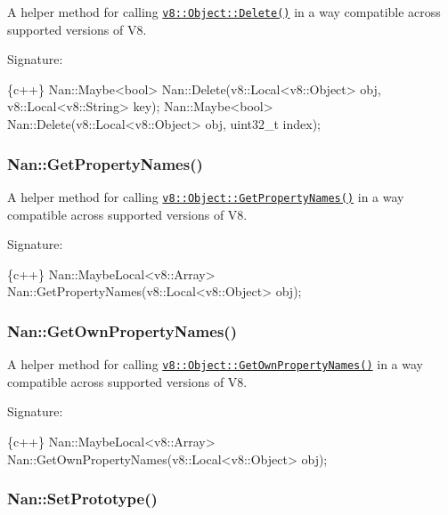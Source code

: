 A helper method for calling \href{https://v8docs.nodesource.com/io.js-3.0/db/d85/classv8_1_1_object.html#a2fa0f5a592582434ed1ceceff7d891ef}{\tt {\ttfamily v8\+::\+Object\+::\+Delete()}} in a way compatible across supported versions of V8.

Signature\+:


\begin{DoxyCode}
\{c++\}
Nan::Maybe<bool> Nan::Delete(v8::Local<v8::Object> obj,
                             v8::Local<v8::String> key);
Nan::Maybe<bool> Nan::Delete(v8::Local<v8::Object> obj, uint32\_t index);
\end{DoxyCode}


\label{_api_nan_get_property_names}%
 \subsubsection*{Nan\+::\+Get\+Property\+Names()}

A helper method for calling \href{https://v8docs.nodesource.com/io.js-3.0/db/d85/classv8_1_1_object.html#aced885270cfd2c956367b5eedc7fbfe8}{\tt {\ttfamily v8\+::\+Object\+::\+Get\+Property\+Names()}} in a way compatible across supported versions of V8.

Signature\+:


\begin{DoxyCode}
\{c++\}
Nan::MaybeLocal<v8::Array> Nan::GetPropertyNames(v8::Local<v8::Object> obj);
\end{DoxyCode}


\label{_api_nan_get_own_property_names}%
 \subsubsection*{Nan\+::\+Get\+Own\+Property\+Names()}

A helper method for calling \href{https://v8docs.nodesource.com/io.js-3.0/db/d85/classv8_1_1_object.html#a79a6e4d66049b9aa648ed4dfdb23e6eb}{\tt {\ttfamily v8\+::\+Object\+::\+Get\+Own\+Property\+Names()}} in a way compatible across supported versions of V8.

Signature\+:


\begin{DoxyCode}
\{c++\}
Nan::MaybeLocal<v8::Array> Nan::GetOwnPropertyNames(v8::Local<v8::Object> obj);
\end{DoxyCode}


\label{_api_nan_set_prototype}%
 \subsubsection*{Nan\+::\+Set\+Prototype()}


